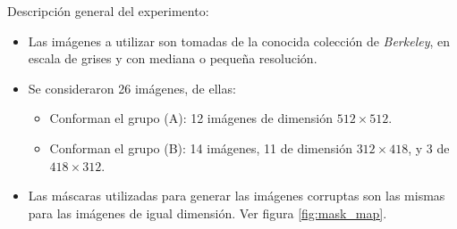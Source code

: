 Descripci\'on general del experimento:
\begin{itemize}
	\item Las im\'agenes a utilizar son tomadas de la conocida colecci\'on de \textit{Berkeley}, en escala de grises y con mediana o pequeña resoluci\'on.
	\item Se consideraron 26 im\'agenes, de ellas:
	\begin{itemize}
		\item Conforman el grupo (A): 12 im\'agenes de dimensi\'on $512 \times 512$.
		\item Conforman el grupo (B): 14 im\'agenes, 11 de dimensi\'on $312 \times 418$, y 3 de $418 \times 312$.
	\end{itemize}
	\item Las m\'ascaras utilizadas para generar las im\'agenes corruptas son las mismas para las im\'agenes de igual dimensión. Ver figura \ref{fig:mask_map}.
	\begin{figure}[H]
		\centering
		\quad
		\quad

\end{figure}
\end{itemize}
